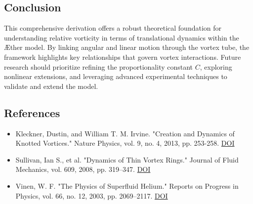 \documentclass[12pt]{article}
\begin{document}
    \subsection*{Conclusion}
    This comprehensive derivation offers a robust theoretical foundation for understanding relative vorticity in terms of translational dynamics within the Æther model. By linking angular and linear motion through the vortex tube, the framework highlights key relationships that govern vortex interactions. Future research should prioritize refining the proportionality constant $C$, exploring nonlinear extensions, and leveraging advanced experimental techniques to validate and extend the model.

    \subsection*{References}
    \begin{itemize}
        \item Kleckner, Dustin, and William T. M. Irvine. "Creation and Dynamics of Knotted Vortices." Nature Physics, vol. 9, no. 4, 2013, pp. 253-258. \href{https://doi.org/10.1038/NPHYS2560}{DOI}
        \item Sullivan, Ian S., et al. "Dynamics of Thin Vortex Rings." Journal of Fluid Mechanics, vol. 609, 2008, pp. 319–347. \href{https://doi.org/10.1017/S0022112008002292}{DOI}
        \item Vinen, W. F. "The Physics of Superfluid Helium." Reports on Progress in Physics, vol. 66, no. 12, 2003, pp. 2069–2117. \href{https://doi.org/10.1088/0034-4885/66/12/R01}{DOI}
    \end{itemize}

    \ifdefined\standalonechapter
    \else
    
    
    
\end{document}

